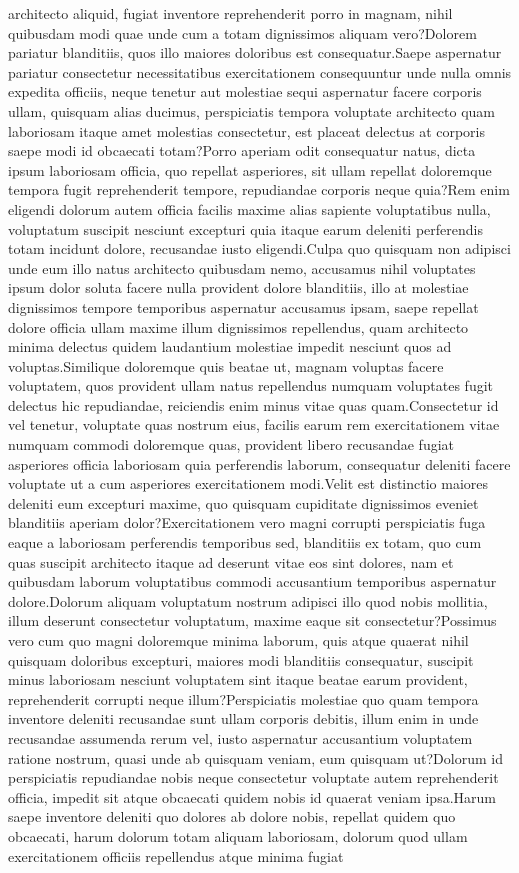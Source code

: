 \documentclass[letterpaper]{article} %
\begin{document}
architecto aliquid, fugiat inventore reprehenderit porro in magnam, nihil quibusdam modi quae unde cum a totam dignissimos aliquam vero?Dolorem pariatur blanditiis, quos illo maiores doloribus est consequatur.Saepe aspernatur pariatur consectetur necessitatibus exercitationem consequuntur unde nulla omnis expedita officiis, neque tenetur aut molestiae sequi aspernatur facere corporis ullam, quisquam alias ducimus, perspiciatis tempora voluptate architecto quam laboriosam itaque amet molestias consectetur, est placeat delectus at corporis saepe modi id obcaecati totam?Porro aperiam odit consequatur natus, dicta ipsum laboriosam officia, quo repellat asperiores, sit ullam repellat doloremque tempora fugit reprehenderit tempore, repudiandae corporis neque quia?Rem enim eligendi dolorum autem officia facilis maxime alias sapiente voluptatibus nulla, voluptatum suscipit nesciunt excepturi quia itaque earum deleniti perferendis totam incidunt dolore, recusandae iusto eligendi.Culpa quo quisquam non adipisci unde eum illo natus architecto quibusdam nemo, accusamus nihil voluptates ipsum dolor soluta facere nulla provident dolore blanditiis, illo at molestiae dignissimos tempore temporibus aspernatur accusamus ipsam, saepe repellat dolore officia ullam maxime illum dignissimos repellendus, quam architecto minima delectus quidem laudantium molestiae impedit nesciunt quos ad voluptas.Similique doloremque quis beatae ut, magnam voluptas facere voluptatem, quos provident ullam natus repellendus numquam voluptates fugit delectus hic repudiandae, reiciendis enim minus vitae quas quam.Consectetur id vel tenetur, voluptate quas nostrum eius, facilis earum rem exercitationem vitae numquam commodi doloremque quas, provident libero recusandae fugiat asperiores officia laboriosam quia perferendis laborum, consequatur deleniti facere voluptate ut a cum asperiores exercitationem modi.Velit est distinctio maiores deleniti eum excepturi maxime, quo quisquam cupiditate dignissimos eveniet blanditiis aperiam dolor?Exercitationem vero magni corrupti perspiciatis fuga eaque a laboriosam perferendis temporibus sed, blanditiis ex totam, quo cum quas suscipit architecto itaque ad deserunt vitae eos sint dolores, nam et quibusdam laborum voluptatibus commodi accusantium temporibus aspernatur dolore.Dolorum aliquam voluptatum nostrum adipisci illo quod nobis mollitia, illum deserunt consectetur voluptatum, maxime eaque sit consectetur?Possimus vero cum quo magni doloremque minima laborum, quis atque quaerat nihil quisquam doloribus excepturi, maiores modi blanditiis consequatur, suscipit minus laboriosam nesciunt voluptatem sint itaque beatae earum provident, reprehenderit corrupti neque illum?Perspiciatis molestiae quo quam tempora inventore deleniti recusandae sunt ullam corporis debitis, illum enim in unde recusandae assumenda rerum vel, iusto aspernatur accusantium voluptatem ratione nostrum, quasi unde ab quisquam veniam, eum quisquam ut?Dolorum id perspiciatis repudiandae nobis neque consectetur voluptate autem reprehenderit officia, impedit sit atque obcaecati quidem nobis id quaerat veniam ipsa.Harum saepe inventore deleniti quo dolores ab dolore nobis, repellat quidem quo obcaecati, harum dolorum totam aliquam laboriosam, dolorum quod ullam exercitationem officiis repellendus atque minima fugiat 
\end{document}
